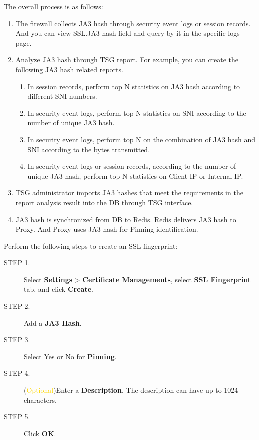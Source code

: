 The overall process is as follows:

\begin{description}[leftmargin=0pt]
    \item
    \begin{enumerate}
        \setlength{\topsep}{0pt}
        \item The firewall collects JA3 hash through security event logs or session records. And you can view SSL.JA3 hash field and query by it in the specific logs page. 
        \item Analyze JA3 hash through TSG report. For example, you can create the following JA3 hash related reports. 
        \begin{enumerate}
            \item  In session records, perform top N statistics on JA3 hash according to different SNI numbers.
            \item  In security event logs, perform top N statistics on SNI according to the number of unique JA3 hash.
            \item  In security event logs, perform top N on the combination of JA3 hash and SNI according to the bytes transmitted.
            \item  In security event logs or session records, according to the number of unique JA3 hash, perform top N statistics on Client IP or Internal IP.
        \end{enumerate}
        \item TSG administrator imports JA3 hashes that meet the requirements in the report analysis result into the DB through TSG interface.
        \item JA3 hash is synchronized from DB to Redis. Redis delivers JA3 hash to Proxy. And Proxy uses JA3 hash for Pinning identification.
    \end{enumerate}
\end{description} 

Perform the following steps to create an SSL fingerprint:

\begin{description}
    \item[STEP 1.]	Select \textbf{Settings} > \textbf{Certificate Managements}, select \textbf{SSL Fingerprint} tab, and click \textbf{Create}.
    \item[STEP 2.]	Add a \textbf{JA3 Hash}. 
    \item[STEP 3.]	Select Yes or No for \textbf{Pinning}.
    \item[STEP 4.]	(\textcolor{gold}{Optional})Enter a \textbf{Description}. The description can have up to 1024 characters. 
    \item[STEP 5.]	Click \textbf{OK}.
\end{description} 

